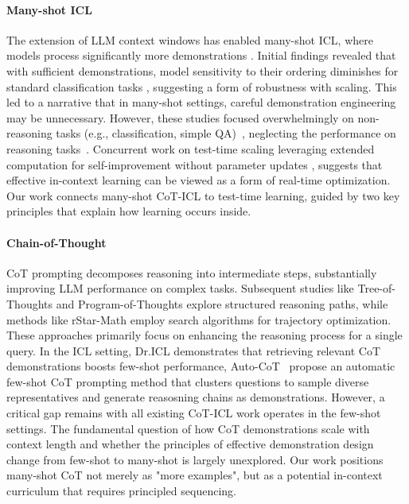 \documentclass{article}
\theoremstyle{plain}
\theoremstyle{definition}
\theoremstyle{remark}
\begin{document}
\paragraph{Many-shot ICL}
The extension of LLM context windows \cite{peng2024yarn, lminfinite} has enabled many-shot ICL, where models process significantly more demonstrations \cite{agarwal2024manyshot, bertsch-etal-2025-context, chung-etal-2024-selection}. Initial findings revealed that with sufficient demonstrations, model sensitivity to their ordering diminishes for standard classification tasks \cite{baek2025revisitingincontextlearninglong, bertsch-etal-2025-context}, suggesting a form of  robustness with scaling. This led to a narrative that in many-shot settings, careful demonstration engineering may be unnecessary. However, these studies focused overwhelmingly on non-reasoning tasks (e.g., classification, simple QA)~\cite{baek2025revisitingincontextlearninglong, bertsch-etal-2025-context}, neglecting the performance on reasoning tasks~\cite{hendrycksmath2021, chung-etal-2025-divlogiceval, xu2025detectiveqaevaluatinglongcontextreasoning, yu2025preludebenchmarkdesignedrequire}. Concurrent work on test-time scaling leveraging extended computation for self-improvement without parameter updates \cite{snell2024scaling, tpo}, suggests that effective in-context learning can be viewed as a form of real-time optimization. Our work connects many-shot CoT-ICL to test-time learning, guided by two key principles that explain how learning occurs inside.

\paragraph{Chain-of-Thought}
CoT prompting \cite{wei2022chain} decomposes reasoning into intermediate steps, substantially improving LLM performance on complex tasks. Subsequent studies like Tree-of-Thoughts \cite{tot} and Program-of-Thoughts \cite{pot} explore structured reasoning paths, while methods like rStar-Math \cite{guan2025rstar} employ search algorithms for trajectory optimization. These approaches primarily focus on enhancing the reasoning process for a single query. In the ICL setting, Dr.ICL \cite{dricl} demonstrates that retrieving relevant CoT demonstrations boosts few-shot performance, Auto-CoT~\cite{zhang2022automaticchainthoughtprompting} propose an automatic few-shot CoT prompting method that clusters questions to sample diverse representatives and generate reasosning chains as demonstrations. However, a critical gap remains with all existing CoT-ICL work operates in the few-shot settings. The fundamental question of how CoT demonstrations scale with context length and whether the principles of effective demonstration design change from few-shot to many-shot is largely unexplored. Our work positions many-shot CoT not merely as "more examples", but as a potential in-context curriculum that requires principled sequencing.
\end{document}
